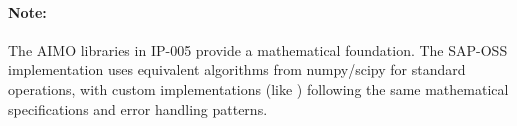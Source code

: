 \paragraph{Note:}
The AIMO libraries in IP-005 provide a mathematical foundation. The SAP-OSS implementation uses equivalent algorithms from numpy/scipy for standard operations, with custom implementations (like ) following the same mathematical specifications and error handling patterns.